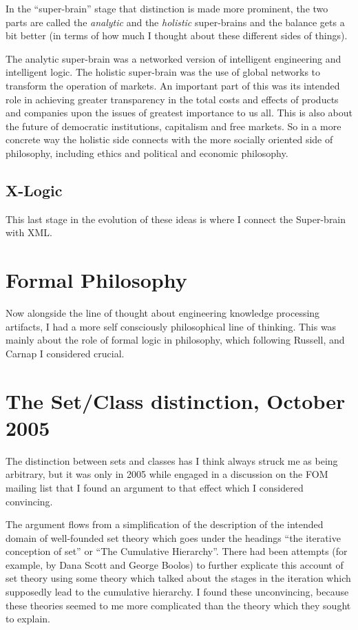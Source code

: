 \documentclass[10pt,titlepage]{book}
\begin{document}
In the ``super-brain'' stage that distinction is made more prominent, the two parts are called the {\it analytic} and the {\it holistic} super-brains and the balance gets a bit better (in terms of how much I thought about these different sides of things).

The analytic super-brain was a networked version of intelligent engineering and intelligent logic.
The holistic super-brain was the use of global networks to transform the operation of markets.
An important part of this was its intended role in achieving greater transparency in the total costs and effects of products and companies upon the issues of greatest importance to us all.
This is also about the future of democratic institutions, capitalism and free markets.
So in a more concrete way the holistic side connects with the more socially oriented side of philosophy, including ethics and political and economic philosophy.

\subsection{X-Logic}

This last stage in the evolution of these ideas is where I connect the Super-brain with XML.

\section{Formal Philosophy}

Now alongside the line of thought about engineering knowledge processing artifacts, I had a more self consciously philosophical line of thinking.
This was mainly about the role of formal logic in philosophy, which following Russell, and Carnap I considered crucial.

\section{The Set/Class distinction, October 2005}\label{October2005}

The distinction between sets and classes has I think always struck me as being arbitrary, but it was only in 2005 while engaged in a discussion on the FOM mailing list that I found an argument to that effect which I considered convincing.

The argument flows from a simplification of the description of the intended domain of well-founded set theory which goes under the headings ``the iterative conception of set'' or ``The Cumulative Hierarchy''.
There had been attempts (for example, by Dana Scott and George Boolos) to further explicate this account of set theory using some theory which talked about the stages in the iteration which supposedly lead to the cumulative hierarchy.
I found these unconvincing, because these theories seemed to me more complicated than the theory which they sought to explain.
\end{document}
